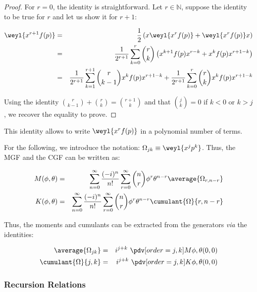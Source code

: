 \begin{proof}
    For $r = 0$, the identity is straightforward. Let $r \in \mathbb{N}$, suppose the identity to be true for $r$ and let us show it for $r+1$:

    \begin{eqnarray}
        \weyl{x^{r+1} f(p)} &=& \frac{1}{2} \left(x \weyl{x^r f(p)} + \weyl{x^r f(p)} x \right) \nonumber\\
        &=& \frac{1}{2^{r+1}}  \sum_{k = 0}^r \binom{r}{k} \left(x^{k+1} f(p) x^{r - k} + x^k f(p) x^{r + 1 - k}\right) \nonumber\\
        &=& \frac{1}{2^{r+1}}  \sum_{k = 1}^{r+1} \binom{r}{k-1} x^k f(p) x^{r + 1 - k}+\frac{1}{2^{r+1}} \sum_{k = 0}^r \binom{r}{k} x^k f(p) x^{r + 1 - k}
    \end{eqnarray}

    Using the identity $\binom{r}{k-1} + \binom{r}{k} = \binom{r+1}{k}$ and that $\binom{j}{k} = 0$ if $k < 0$ or $k > j$, we recover the equality to prove.
\end{proof}

\begin{remark}
    This identity allows to write $\weyl{x^r f(p)}$ in a polynomial number of terms.
\end{remark}

For the following, we introduce the notation: $\Omega_{j k} \equiv \weyl{x^j p^k}$. Thus, the MGF and the CGF can be written as:

\begin{eqnarray}
    M(\phi, \theta) &=& \sum_{n = 0}^\infty \frac{(-i)^n}{n!} \sum_{r = 0}^\infty \binom{n}{r} \phi^r \theta^{n - r} \average{\Omega_{r, n-r}}\\
    K(\phi, \theta) &=& \sum_{n = 0}^\infty \frac{(-i)^n}{n!} \sum_{r = 0}^\infty \binom{n}{r} \phi^r \theta^{n - r} \cumulant{\Omega}{{r, n-r}}
\end{eqnarray}

Thus, the moments and cumulants can be extracted from the generators \textit{via} the identities:

\begin{eqnarray}
    \average{\Omega_{j k}} &=& i^{j+k} \ \pdv[order = {j,k}]{M}{\phi,\theta}(0, 0)\\
    \cumulant{\Omega}{{j, k}} &=& i^{j+k} \  \pdv[order = {j,k}]{K}{\phi,\theta}(0, 0)
\end{eqnarray}

\subsubsection{Recursion Relations}

